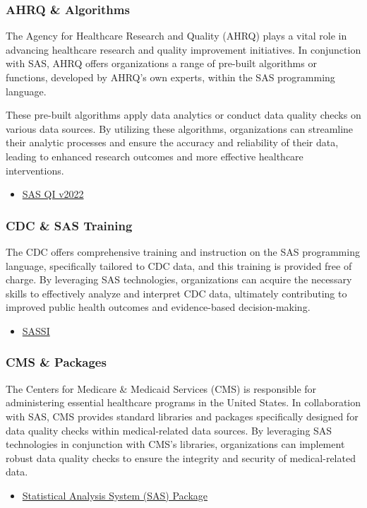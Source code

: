 \subsubsection{AHRQ \& Algorithms}
The Agency for Healthcare Research and Quality (AHRQ) plays a vital role in advancing healthcare research and quality improvement initiatives. In conjunction with SAS, AHRQ offers organizations a range of pre-built algorithms or functions, developed by AHRQ's own experts, within the SAS programming language. 

These pre-built algorithms apply data analytics or conduct data quality checks on various data sources. By utilizing these algorithms, organizations can streamline their analytic processes and ensure the accuracy and reliability of their data, leading to enhanced research outcomes and more effective healthcare interventions.
\begin{itemize}
    \item \href{https://qualityindicators.ahrq.gov/software/sas_qi}{SAS QI v2022} \cite{AHRQ}
\end{itemize}

\subsubsection{CDC \& SAS Training}
The CDC offers comprehensive training and instruction on the SAS programming language, specifically tailored to CDC data, and this training is provided free of charge. By leveraging SAS technologies, organizations can acquire the necessary skills to effectively analyze and interpret CDC data, ultimately contributing to improved public health outcomes and evidence-based decision-making.
\begin{itemize}
    \item \href{https://www.cdc.gov/std/sassi/default.htm}{SASSI} \cite{CDC}
\end{itemize}

\subsubsection{CMS \& Packages}
The Centers for Medicare \& Medicaid Services (CMS) is responsible for administering essential healthcare programs in the United States. In collaboration with SAS, CMS provides standard libraries and packages specifically designed for data quality checks within medical-related data sources. By leveraging SAS technologies in conjunction with CMS's libraries, organizations can implement robust data quality checks to ensure the integrity and security of medical-related data.

\begin{itemize}
    \item \href{https://qualitynet.cms.gov/outpatient/public-reporting/overall-ratings/sas}{Statistical Analysis System (SAS) Package} \cite{CMS}
\end{itemize}